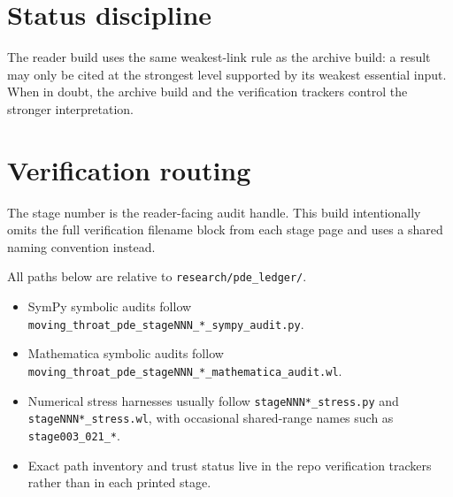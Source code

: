 \section{Status discipline}

The reader build uses the same weakest-link rule as the archive build: a result
may only be cited at the strongest level supported by its weakest essential
input. When in doubt, the archive build and the verification trackers control
the stronger interpretation.

\section{Verification routing}

The stage number is the reader-facing audit handle.  This build intentionally
omits the full verification filename block from each stage page and uses a
shared naming convention instead.

All paths below are relative to \nolinkurl{research/pde_ledger/}.

\begin{itemize}[leftmargin=2.2em]
  \item SymPy symbolic audits follow
  \nolinkurl{moving_throat_pde_stageNNN_*_sympy_audit.py}.
  \item Mathematica symbolic audits follow
  \nolinkurl{moving_throat_pde_stageNNN_*_mathematica_audit.wl}.
  \item Numerical stress harnesses usually follow
  \nolinkurl{stageNNN*_stress.py} and \nolinkurl{stageNNN*_stress.wl}, with
  occasional shared-range names such as \nolinkurl{stage003_021_*}.
  \item Exact path inventory and trust status live in the repo verification
  trackers rather than in each printed stage.
\end{itemize}
